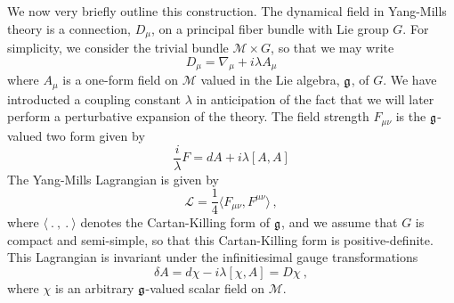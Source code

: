 \documentclass[12pt]{article}
\newcommand{\eL}{\mathscr{L}}
\newcommand{\M}{\mathscr{M}}
\theoremstyle{plain}
\theoremstyle{definition}
\def\ben{\begin{equation}}
\def\een{\end{equation}}
\begin{document}
We now very briefly outline this construction. The dynamical field in Yang-Mills theory is a connection, $D_\mu$, on a principal fiber bundle with Lie group $G$. For simplicity, 
we consider the trivial bundle $\M \times G$, so that we may write
\ben
D_\mu=\nabla_\mu + i\lambda A_\mu
\een
where $A_\mu$ is a one-form field on $\M$ valued in the Lie algebra, $\frak{g}$, of $G$. We have 
introducted a coupling constant $\lambda$ in anticipation of the fact that we will later perform 
a perturbative expansion of the theory. 
The field strength $F_{\mu\nu}$ is the $\frak{g}$-valued two form given by
\ben
\frac{i}{\lambda} F = dA + i\lambda[A,A]
\een
The Yang-Mills Lagrangian is given by
\ben
\eL = \frac{1}{4} \langle F_{\mu\nu},F^{\mu\nu} \rangle \, ,
\label{yml}
\een
where $\langle \ . \ , \ . \ \rangle$ denotes the Cartan-Killing form of $\frak{g}$, and we assume that $G$ is compact and semi-simple, so that this Cartan-Killing form is positive-definite. This Lagrangian is invariant under the infinitiesimal  gauge transformations
\ben\label{gauge}
\delta A = d \chi - i\lambda [\chi, A] = D \chi \ , 
\een
where $\chi$ is an arbitrary $\frak{g}$-valued scalar field on $\M$.
\end{document}
